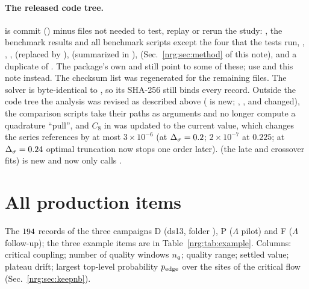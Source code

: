 \paragraph{The released code tree.}  is commit  () minus files not
needed to test, replay or rerun the study: , the benchmark results and all benchmark scripts except the four that
the tests run, , , ,  (replaced by ),
 (summarized in ),  (Sec.~\ref{nrg:sec:method} of this note),
 and a duplicate of . The package's own  and
 still point to some of these; use  and this note instead. The checksum list
 was regenerated for the remaining files. The solver  is byte-identical to
, so its SHA-256 still binds every record. Outside the code tree the analysis was revised as described above
( is new; , ,  and 
changed), the comparison scripts take their paths as arguments and no longer compute a quadrature ``pull'', and $C_8$ in
 was updated to the current value, which changes the series references by at most $3\times10^{-6}$ (at
$\Delta_\sigma=0.2$; $2\times10^{-7}$ at $0.225$; at $\Delta_\sigma=0.24$ optimal truncation now stops one order later).  (the
late and crossover fits) is new and  now only calls .

\section{All production items}\label{nrg:app:items}
The $194$ records of the three campaigns D (ds13, folder ), P ($\Lambda$ pilot) and F
($\Lambda$ follow-up); the three example items are in Table~\ref{nrg:tab:example}. Columns: critical coupling; number of quality windows
$n_q$; quality range; settled value; plateau drift; largest top-level probability $p_{\rm edge}$ over the sites of the critical flow
(Sec.~\ref{nrg:sec:keepnb}).
\begingroup\scriptsize\setlength{\tabcolsep}{3pt}

\endgroup

